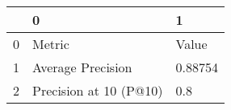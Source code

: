 \begin{tabular}{lll}
\toprule
{} &                       0 &        1 \\
\midrule
0 &                  Metric &    Value \\
1 &       Average Precision &  0.88754 \\
2 &  Precision at 10 (P@10) &      0.8 \\
\bottomrule
\end{tabular}
